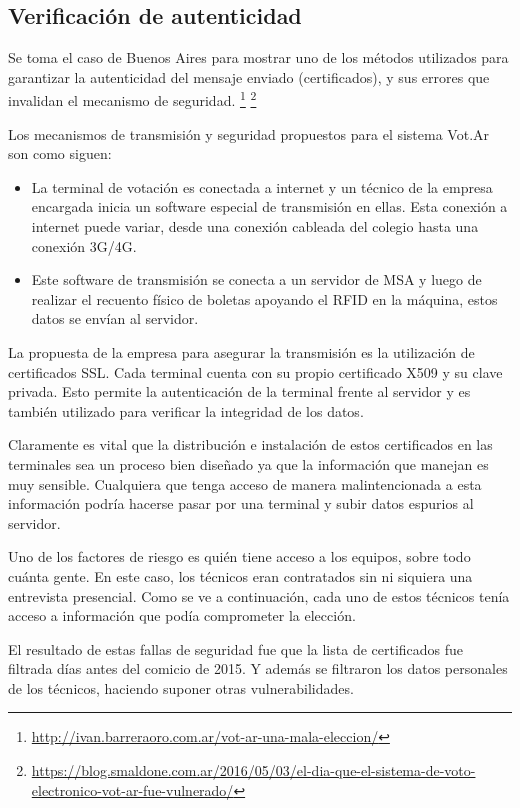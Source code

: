 \subsection{Verificación de autenticidad}

Se toma el caso de Buenos Aires para mostrar uno de los métodos utilizados para garantizar la autenticidad del mensaje enviado (certificados), y sus errores que invalidan el mecanismo de seguridad.
\footnote{\url{http://ivan.barreraoro.com.ar/vot-ar-una-mala-eleccion/}}
\footnote{\url{https://blog.smaldone.com.ar/2016/05/03/el-dia-que-el-sistema-de-voto-electronico-vot-ar-fue-vulnerado/}}

Los mecanismos de transmisión y seguridad propuestos para el sistema Vot.Ar son como siguen:
\begin{itemize}
	\item La terminal de votación es conectada a internet y un técnico de la empresa encargada inicia un software especial de transmisión en ellas. Esta conexión a internet puede variar, desde una conexión cableada del colegio hasta una conexión 3G/4G.
	\item Este software de transmisión se conecta a un servidor de MSA y luego de realizar el recuento físico de boletas apoyando el RFID en la máquina, estos datos se envían al servidor.
\end{itemize}

La propuesta de la empresa para asegurar la transmisión es la utilización de certificados SSL. Cada terminal cuenta con su propio certificado X509 y su clave privada. Esto permite la autenticación de la terminal frente al servidor y es también utilizado para verificar la integridad de los datos.

Claramente es vital que la distribución e instalación de estos certificados en las terminales sea un proceso bien diseñado ya que la información que manejan es muy sensible. Cualquiera que tenga acceso de manera malintencionada a esta información podría hacerse pasar por una terminal y subir datos espurios al servidor.

Uno de los factores de riesgo es quién tiene acceso a los equipos, sobre todo cuánta gente. En este caso, los técnicos eran contratados sin ni siquiera una entrevista presencial. Como se ve a continuación, cada uno de estos técnicos tenía acceso a información que podía comprometer la elección.

El resultado de estas fallas de seguridad fue que la lista de certificados fue filtrada días antes del comicio de 2015. Y además se filtraron los datos personales de los técnicos, haciendo suponer otras vulnerabilidades.

